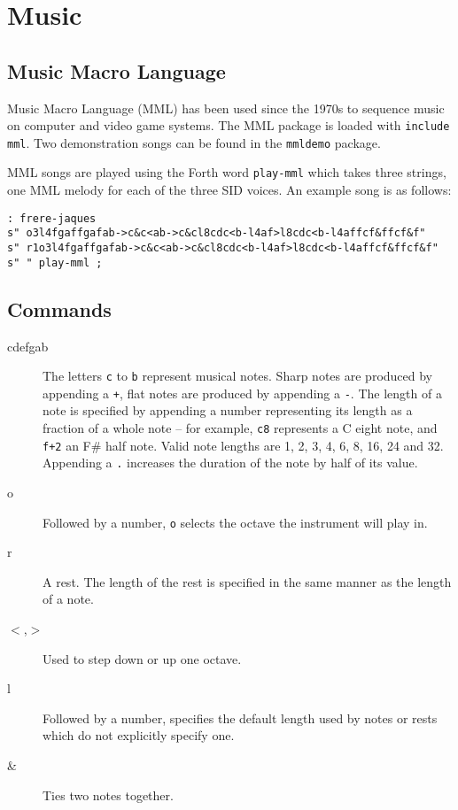 \chapter{Music}

\section{Music Macro Language}

Music Macro Language (MML) has been used since the 1970s to sequence music on computer and video game systems. The MML package is loaded with \texttt{include mml}. Two demonstration songs can be found in the \texttt{mmldemo} package.

MML songs are played using the Forth word \texttt{play-mml} which takes three strings, one MML melody for each of the three SID voices. An example song is as follows:

\begin{verbatim}
: frere-jaques
s" o3l4fgaffgafab->c&c<ab->c&cl8cdc<b-l4af>l8cdc<b-l4affcf&ffcf&f"
s" r1o3l4fgaffgafab->c&c<ab->c&cl8cdc<b-l4af>l8cdc<b-l4affcf&ffcf&f"
s" " play-mml ;
\end{verbatim}

\section{Commands}

\begin{description}
\item[cdefgab] The letters \texttt{c} to \texttt{b} represent musical notes. Sharp notes are produced by appending a \texttt{+}, flat notes are produced by appending a \texttt{-}. The length of a note is specified by appending a number representing its length as a fraction of a whole note -- for example, \texttt{c8} represents a C eight note, and \texttt{f+2} an F\# half note. Valid note lengths are 1, 2, 3, 4, 6, 8, 16, 24 and 32. Appending a \texttt{.} increases the duration of the note by half of its value.
\item[o] Followed by a number, \texttt{o} selects the octave the instrument will play in.
\item[r] A rest. The length of the rest is specified in the same manner as the length of a note.
\item[$<$,$>$] Used to step down or up one octave.
\item[l] Followed by a number, specifies the default length used by notes or rests which do not explicitly specify one.
\item[\&] Ties two notes together.
\end{description}
